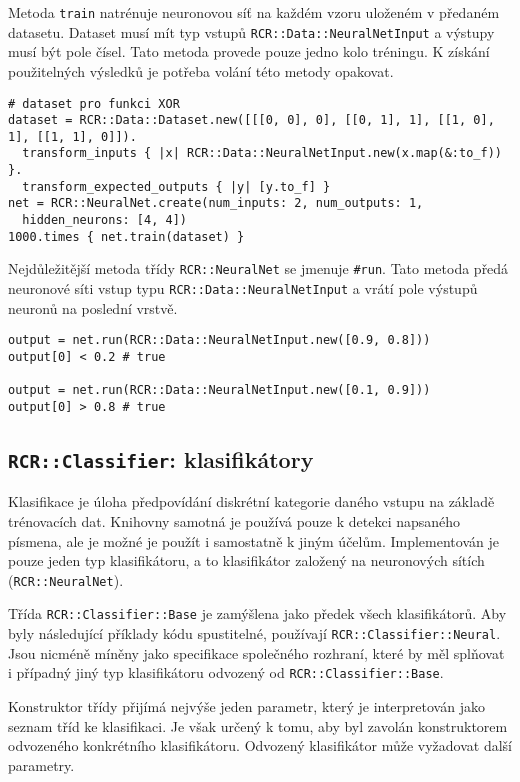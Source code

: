 \documentclass[a4paper]{article}
\begin{document}
Metoda \texttt{train} natrénuje neuronovou síť na každém vzoru uloženém
v předaném datasetu. Dataset musí mít typ vstupů \texttt{RCR::Data::NeuralNetInput} a
výstupy musí být pole čísel. Tato metoda provede pouze jedno kolo tréningu.
K získání použitelných výsledků je potřeba volání této metody opakovat.
\begin{lstlisting}
# dataset pro funkci XOR
dataset = RCR::Data::Dataset.new([[[0, 0], 0], [[0, 1], 1], [[1, 0], 1], [[1, 1], 0]]).
  transform_inputs { |x| RCR::Data::NeuralNetInput.new(x.map(&:to_f)) }.
  transform_expected_outputs { |y| [y.to_f] }
net = RCR::NeuralNet.create(num_inputs: 2, num_outputs: 1,
  hidden_neurons: [4, 4])
1000.times { net.train(dataset) }
\end{lstlisting}

Nejdůležitější metoda třídy \texttt{RCR::NeuralNet} se jmenuje \texttt{\#run}.
Tato metoda předá neuronové síti vstup typu \texttt{RCR::Data::NeuralNetInput} a
vrátí pole výstupů neuronů na poslední vrstvě.
\begin{lstlisting}
output = net.run(RCR::Data::NeuralNetInput.new([0.9, 0.8]))
output[0] < 0.2 # true

output = net.run(RCR::Data::NeuralNetInput.new([0.1, 0.9]))
output[0] > 0.8 # true
\end{lstlisting}


\subsection{\texttt{RCR::Classifier}: klasifikátory}

Klasifikace je úloha předpovídání diskrétní kategorie daného vstupu na základě
trénovacích dat. Knihovny samotná je používá pouze k detekci napsaného písmena,
ale je možné je použít i samostatně k jiným účelům. Implementován je pouze jeden
typ klasifikátoru, a to klasifikátor založený na neuronových sítích
(\texttt{RCR::NeuralNet}).

Třída \texttt{RCR::Classifier::Base} je zamýšlena jako předek všech
klasifikátorů. Aby byly následující příklady
kódu spustitelné, používají \texttt{RCR::Classifier::Neural}. Jsou nicméně
míněny jako specifikace společného rozhraní, které by měl splňovat i případný
jiný typ klasifikátoru odvozený od \texttt{RCR::Classifier::Base}.

Konstruktor třídy přijímá nejvýše jeden parametr, který je
interpretován jako seznam tříd ke klasifikaci. Je však určený k tomu,
aby byl zavolán konstruktorem odvozeného konkrétního klasifikátoru.
Odvozený klasifikátor může vyžadovat další parametry.
\end{document}
